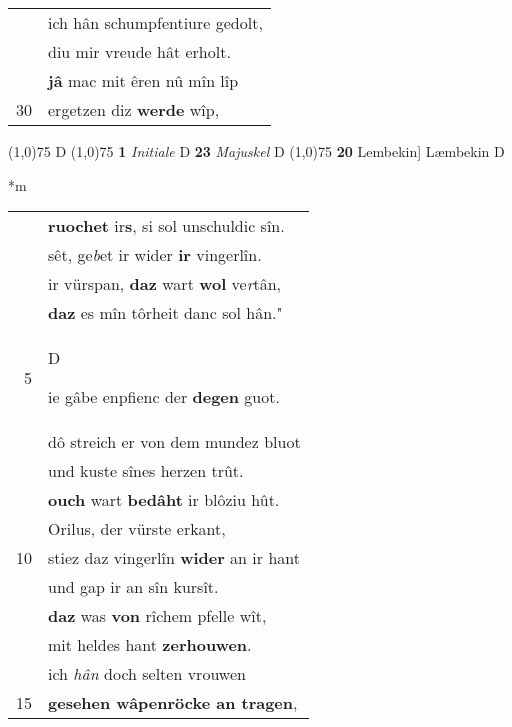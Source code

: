 \documentclass[8pt,a4paper,notitlepage]{article}
\begin{document}
\begin{table}[ht]
\begin{minipage}[t]{0.5\linewidth}
\begin{tabular}{rl}
 & ich hân schumpfentiure gedolt,\\ 
 & diu mir vreude hât erholt.\\ 
 & \textbf{jâ} mac mit êren nû mîn lîp\\ 
30 & ergetzen diz \textbf{werde} wîp,\\ 
\end{tabular}
\scriptsize
\line(1,0){75} \newline
D \newline
\line(1,0){75} \newline
\textbf{1} \textit{Initiale} D  \textbf{23} \textit{Majuskel} D  \newline
\line(1,0){75} \newline
\textbf{20} Lembekin] Læmbekin D \newline
\end{minipage}
\hspace{0.5cm}
\begin{minipage}[t]{0.5\linewidth}
\small
\begin{center}*m
\end{center}
\begin{tabular}{rl}
 & \textbf{ruochet} ir\textbf{s}, si sol unschuldic sîn.\\ 
 & sêt, ge\textit{b}et ir wider \textbf{ir} vingerlîn.\\ 
 & ir vürspan, \textbf{daz} wart \textbf{wol} ve\textit{r}tân,\\ 
 & \textbf{daz} es mîn tôrheit danc sol hân."\\ 
5 & \begin{large}D\end{large}ie gâbe enpfienc der \textbf{degen} guot.\\ 
 & dô streich er von dem mundez bluot\\ 
 & und kuste sînes herzen trût.\\ 
 & \textbf{ouch} wart \textbf{bedâht} ir blôziu hût.\\ 
 & Orilus, der vürste erkant,\\ 
10 & stiez daz vingerlîn \textbf{wider} an ir hant\\ 
 & und gap ir an sîn kursît.\\ 
 & \textbf{daz} was \textbf{von} rîchem pfelle wît,\\ 
 & mit heldes hant \textbf{zerhouwen}.\\ 
 & ich \textit{hân} doch selten vrouwen\\ 
15 & \textbf{gesehen wâpenröcke an tragen},\\ 

\end{tabular}
\end{minipage}
\end{table}
\end{document}
